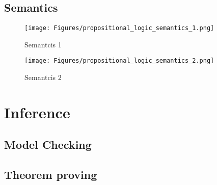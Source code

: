 \subsection{Semantics}

\begin{figure}[H]
    \centering
    \texttt{[image: Figures/propositional\_logic\_semantics\_1.png]}
    \caption{Semantcis 1}
    \label{fig:S1}
\end{figure}

\begin{figure}[H]
    \centering
    \texttt{[image: Figures/propositional\_logic\_semantics\_2.png]}
    \caption{Semantcis 2}
    \label{fig:S2}
\end{figure}













\section{Inference}
\subsection{Model Checking}

\subsection{Theorem proving}

